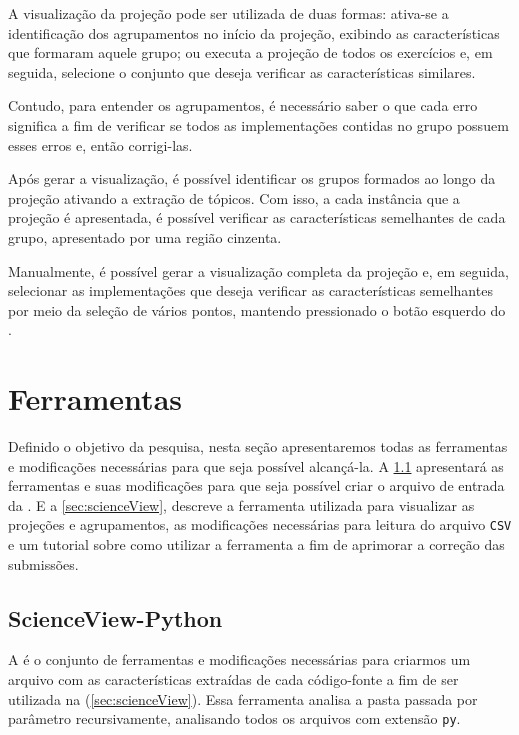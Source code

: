 			A visualização da projeção pode ser utilizada de duas formas: ativa-se a identificação
			dos agrupamentos no início da projeção, exibindo as características que formaram aquele
			grupo; ou executa a projeção de todos os exercícios e, em seguida, selecione o conjunto
			que deseja verificar as características similares.
			
			Contudo, para entender os agrupamentos, é necessário saber o que cada erro significa
			a fim de verificar se todos as implementações contidas no grupo possuem esses erros e,
			então corrigi-las.
			
			Após gerar a visualização, é possível identificar os grupos formados ao longo da
			projeção ativando a extração de tópicos. Com isso, a cada instância que a projeção
			é apresentada, é possível verificar as características semelhantes de cada grupo,
			apresentado por uma região cinzenta.
			
			Manualmente, é possível gerar a visualização completa da projeção e, em seguida,
			selecionar as implementações que deseja verificar as características semelhantes
			por meio da seleção de vários pontos, mantendo pressionado o botão esquerdo do
			.
		
	\section{Ferramentas}

		Definido o objetivo da pesquisa, nesta seção apresentaremos todas as ferramentas
		e modificações necessárias para que seja possível alcançá-la. A \cref{sec:scienceView-Python}
		apresentará as ferramentas e suas modificações para que seja possível criar
		o arquivo de entrada da . E a \cref{sec:scienceView}, descreve a
		ferramenta utilizada para visualizar as projeções e agrupamentos, as
		modificações necessárias para leitura do arquivo \texttt{CSV} e um tutorial
		sobre como utilizar a ferramenta a fim de aprimorar a correção das submissões.
		

		\subsection{ScienceView-Python}
		\label{sec:scienceView-Python}
			A  é o conjunto de ferramentas e modificações
			necessárias para criarmos um arquivo com as características extraídas de
			cada código-fonte a fim de ser utilizada na  (\cref{sec:scienceView}).
			Essa ferramenta analisa a pasta passada por parâmetro recursivamente,
			analisando todos os arquivos com extensão \texttt{py}.
			
